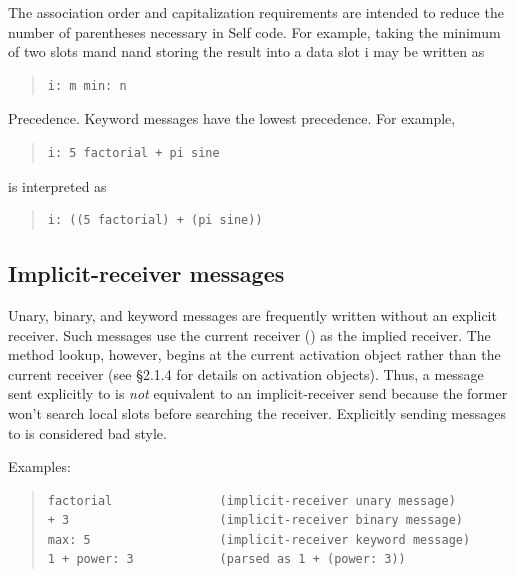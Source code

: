 \documentclass[letterpaper,10pt,english]{sphinxmanual}
\begin{document}
The association order and capitalization requirements are intended to reduce the number of parentheses necessary in Self code. For example, taking the minimum of two slots mand nand storing the result into a data slot i may be written as
\begin{quote}

\begin{Verbatim}[commandchars=\\\{\}]
i: m min: n
\end{Verbatim}
\end{quote}

Precedence. Keyword messages have the lowest precedence. For example,
\begin{quote}

\begin{Verbatim}[commandchars=\\\{\}]
i: 5 factorial + pi sine
\end{Verbatim}
\end{quote}

is interpreted as
\begin{quote}

\begin{Verbatim}[commandchars=\\\{\}]
i: ((5 factorial) + (pi sine))
\end{Verbatim}
\end{quote}


\subsection{Implicit-receiver messages}
\label{langref:implicit-receiver-messages}\label{langref:index-51}
Unary, binary, and keyword messages are frequently written without an explicit receiver. Such messages use the current receiver () as the implied receiver. The method lookup, however, begins at the current activation object rather than the current receiver (see \S{}2.1.4 for details on activation objects). Thus, a message sent explicitly to  is \emph{not} equivalent to an implicit-receiver send because the former won’t search local slots before searching the receiver. Explicitly sending messages to  is considered bad style.

Examples:
\begin{quote}

\begin{Verbatim}[commandchars=\\\{\}]
factorial               (implicit-receiver unary message)
+ 3                     (implicit-receiver binary message)
max: 5                  (implicit-receiver keyword message)
1 + power: 3            (parsed as 1 + (power: 3))
\end{Verbatim}
\end{quote}
\end{document}

